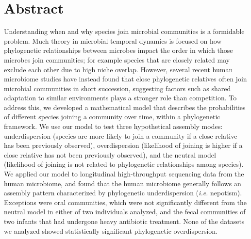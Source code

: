 \documentclass{article}
\begin{document}
\newpage


{\parindent0pt \section{Abstract}}
Understanding when and why species join microbial communities is a formidable problem. Much theory in microbial temporal dynamics is focused on how phylogenetic relationships between microbes impact the order in which those microbes join communities; for example species that are closely related may exclude each other due to high niche overlap. However, several recent human microbiome studies have instead found that close phylogenetic relatives often join microbial communities in short succession, suggesting factors such as shared adaptation to similar environments plays a stronger role than competition. To address this, we developed a mathematical model that describes the probabilities of different species joining a community over time, within a phylogenetic framework. We use our model to test three hypothetical assembly modes: underdispersion (species are more likely to join a community if a close relative has been previously observed), overdispersion (likelihood of joining is higher if a close relative has not been previously observed), and the neutral model (likelihood of joining is not related to phylogenetic relationships among species). We applied our model to longitudinal high-throughput sequencing data from the human microbiome, and found that the human microbiome generally follows an assembly pattern characterized by phylogenetic underdispersion (\emph{i.e.} nepotism). Exceptions were oral communities, which were not significantly different from the neutral model in either of two individuals analyzed, and the fecal communities of two infants that had undergone heavy antibiotic treatment. None of the datasets we analyzed showed statistically significant phylogenetic overdispersion.
\\\par
\end{document}
